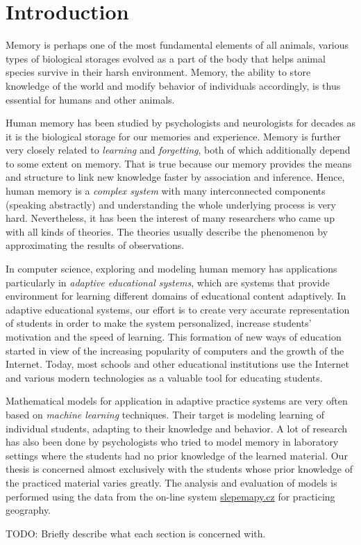 \chapter{Introduction}

Memory is perhaps one of the most fundamental elements of all animals, various types of biological storages evolved as a part of the body that helps animal species survive in their harsh environment. Memory, the ability to store knowledge of the world and modify behavior of individuals accordingly, is thus essential for humans and other animals.

Human memory has been studied by psychologists and neurologists for decades as it is the biological storage for our memories and experience. Memory is further very closely related to \textit{learning} and \textit{forgetting}, both of which additionally depend to some extent on memory. That is true because our memory provides the means and structure to link new knowledge faster by association and inference. Hence, human memory is a \textit{complex system} with many interconnected components (speaking abstractly) and understanding the whole underlying process is very hard. Nevertheless, it has been the interest of many researchers who came up with all kinds of theories. The theories usually describe the phenomenon by approximating the results of observations.

In computer science, exploring and modeling human memory has applications particularly in \textit{adaptive educational systems}, which are systems that provide environment for learning different domains of educational content adaptively. In adaptive educational systems, our effort is to create very accurate representation of students in order to make the system personalized, increase students' motivation and the speed of learning. This formation of new ways of education started in view of the increasing popularity of computers and the growth of the Internet. Today, most schools and other educational institutions use the Internet and various modern technologies as a valuable tool for educating students.

Mathematical models for application in adaptive practice systems are very often based on \textit{machine learning} techniques. Their target is modeling learning of individual students, adapting to their knowledge and behavior. A lot of research has also been done by psychologists who tried to model memory in laboratory settings where the students had no prior knowledge of the learned material. Our thesis is concerned almost exclusively with the students whose prior knowledge of the practiced material varies greatly. The analysis and evaluation of models is performed using the data from the on-line system \url{slepemapy.cz} for practicing geography.

TODO: Briefly describe what each section is concerned with.
